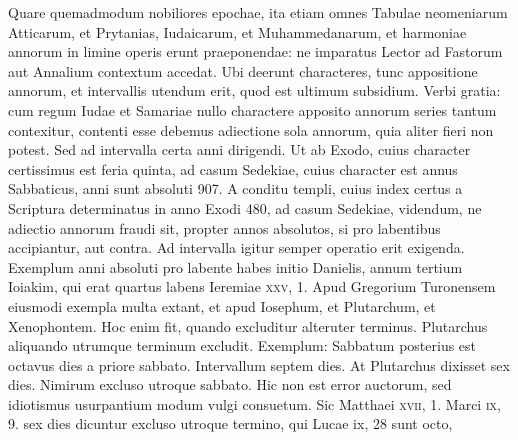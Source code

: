 \begin{parnumbers}
{}
\lnr{}Quare quemadmodum nobiliores epochae,
ita etiam omnes Tabulae neomeniarum Atticarum, et Prytanias,
Iudaicarum, et Muhammedanarum, et harmoniae annorum
in limine operis erunt praeponendae: ne imparatus Lector ad Fastorum
aut Annalium contextum accedat.
\lnr{}Ubi deerunt characteres,
tunc appositione annorum, et intervallis utendum erit, quod est ultimum
subsidium.
\lnr{}Verbi gratia: cum regum Iudae et Samariae nullo
charactere apposito annorum series tantum contexitur, contenti esse
debemus adiectione sola annorum, quia aliter fieri non potest.
\lnr{}Sed
ad intervalla certa anni dirigendi.
\lnr{}Ut ab Exodo, cuius character certissimus
est feria quinta, ad casum Sedekiae, cuius character est annus
Sabbaticus, anni sunt absoluti 907.
\lnr{}A conditu templi, cuius index certus
a Scriptura determinatus in anno Exodi 480, ad casum Sedekiae,
videndum, ne adiectio annorum fraudi sit, propter annos absolutos,
si pro labentibus accipiantur, aut contra.
\lnr{}Ad intervalla igitur
semper operatio erit exigenda.
\lnr{}Exemplum anni absoluti pro labente
habes initio Danielis, annum tertium Ioiakim, qui erat quartus labens
Ieremiae \textsc{xxv}, 1.
\lnr{}Apud Gregorium Turonensem eiusmodi
exempla multa extant, et apud Iosephum, et Plutarchum, et
Xenophontem.
\lnr{}Hoc enim fit, quando excluditur alteruter terminus.
\lnr{}Plutarchus aliquando utrumque terminum excludit.
\lnr{}Exemplum: Sabbatum
posterius est octavus dies a priore sabbato.
\lnr{}Intervallum septem
dies.
\lnr{}At Plutarchus dixisset sex dies.
\lnr{}Nimirum excluso utroque
sabbato.
\lnr{}Hic non est error auctorum, sed idiotismus usurpantium
modum vulgi consuetum.
\lnr{}Sic Matthaei \textsc{xvii}, 1.
 Marci \textsc{ix}, 9.
 sex
dies dicuntur excluso utroque termino, qui Lucae {ix}, 28
 sunt octo,

\end{parnumbers}

